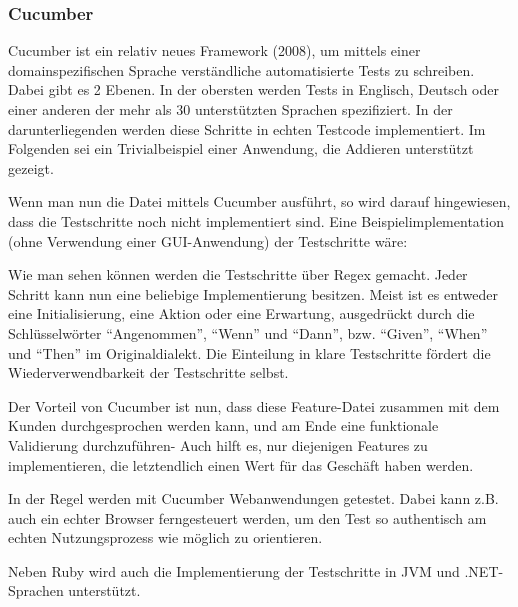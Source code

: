 \subsubsection{Cucumber}
\label{sec:cucumber}
Cucumber ist ein relativ neues Framework (2008), um mittels einer domainspezifischen Sprache verständliche automatisierte Tests zu schreiben. Dabei gibt es 2 Ebenen. In der obersten werden Tests in Englisch, Deutsch oder einer anderen der mehr als 30 unterstützten Sprachen spezifiziert. In der darunterliegenden werden diese Schritte in echten Testcode implementiert. Im Folgenden sei ein Trivialbeispiel einer Anwendung, die Addieren unterstützt gezeigt.



Wenn man nun die Datei mittels Cucumber ausführt, so wird darauf hingewiesen, dass die Testschritte noch nicht implementiert sind.
Eine Beispielimplementation (ohne Verwendung einer GUI-Anwendung) der Testschritte wäre:



Wie man sehen können werden die Testschritte über Regex gemacht. Jeder Schritt kann nun eine beliebige Implementierung besitzen. Meist ist es entweder eine Initialisierung, eine Aktion oder eine Erwartung, ausgedrückt durch die Schlüsselwörter "`Angenommen"', "`Wenn"' und "`Dann"', bzw. "`Given"', "`When"' und "`Then"' im Originaldialekt. Die Einteilung in klare Testschritte fördert die Wiederverwendbarkeit der Testschritte selbst.

Der Vorteil von Cucumber ist nun, dass diese Feature-Datei zusammen mit dem Kunden durchgesprochen werden kann, und am Ende eine funktionale Validierung durchzuführen- Auch hilft es, nur diejenigen Features zu implementieren, die letztendlich einen Wert für das Geschäft haben werden. 
 
In der Regel werden mit Cucumber Webanwendungen getestet. Dabei kann z.B. auch ein echter Browser ferngesteuert werden, um den Test so authentisch am echten Nutzungsprozess wie möglich zu orientieren. 

Neben Ruby wird auch die Implementierung der Testschritte in JVM und .NET-Sprachen unterstützt.